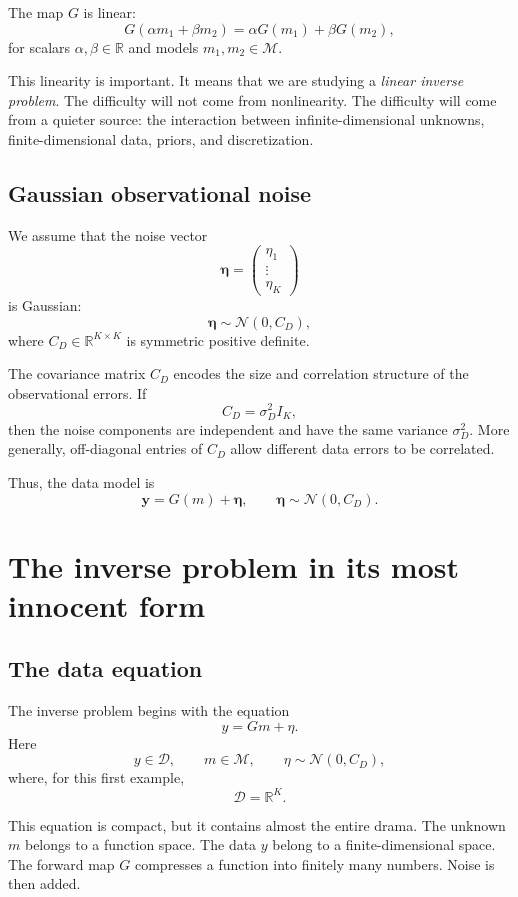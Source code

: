 \documentclass[11pt,a4paper]{book}
\newcommand{\M}{\mathcal{M}}      %
\newcommand{\D}{\mathcal{D}}      %
\newcommand{\noise}{\eta}
\newcommand{\obs}{y}
\newcommand{\G}{G}
\begin{document}
The map $\G$ is linear:
\[
    \G(\alpha m_1 + \beta m_2)
    =
    \alpha \G(m_1) + \beta \G(m_2),
\]
for scalars $\alpha,\beta \in \mathbb{R}$ and models $m_1,m_2 \in \M$.

This linearity is important. It means that we are studying a \emph{linear
inverse problem}. The difficulty will not come from nonlinearity. The difficulty
will come from a quieter source: the interaction between infinite-dimensional
unknowns, finite-dimensional data, priors, and discretization.

\subsection{Gaussian observational noise}

We assume that the noise vector
\[
    \bm{\eta}
    =
    \begin{pmatrix}
        \eta_1\\
        \vdots\\
        \eta_K
    \end{pmatrix}
\]
is Gaussian:
\[
    \bm{\eta} \sim \mathcal{N}(0,C_D),
\]
where $C_D \in \mathbb{R}^{K \times K}$ is symmetric positive definite.

The covariance matrix $C_D$ encodes the size and correlation structure of the
observational errors. If
\[
    C_D = \sigma_D^2 I_K,
\]
then the noise components are independent and have the same variance
$\sigma_D^2$. More generally, off-diagonal entries of $C_D$ allow different
data errors to be correlated.

Thus, the data model is
\[
    \bm{y}
    =
    \G(m) + \bm{\eta},
    \qquad
    \bm{\eta} \sim \mathcal{N}(0,C_D).
\]

\section{The inverse problem in its most innocent form}

\subsection{The data equation}

The inverse problem begins with the equation
\[
    \obs = \G m + \noise.
\]
Here
\[
    \obs \in \D,
    \qquad
    m \in \M,
    \qquad
    \noise \sim \mathcal{N}(0,C_D),
\]
where, for this first example,
\[
    \D = \mathbb{R}^K.
\]

This equation is compact, but it contains almost the entire drama. The unknown
$m$ belongs to a function space. The data $\obs$ belong to a finite-dimensional
space. The forward map $\G$ compresses a function into finitely many numbers.
Noise is then added.
\end{document}

